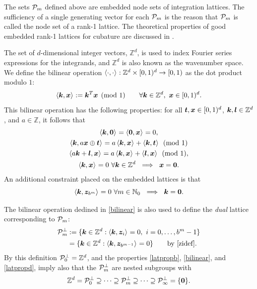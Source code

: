 \documentclass[graybox]{svmult}
\newcommand{\Z}{\mathbb{Z}} %
\newcommand{\N}{\mathbb{N}} %
\newcommand{\bszero}{\boldsymbol{0}} %
\newcommand{\bst}{\boldsymbol{t}}    %
\newcommand{\bsx}{\boldsymbol{x}}    %
\newcommand{\bsz}{\boldsymbol{z}}    %
\begin{document}
The sets $\mathcal{P}_m$ defined above are embedded node sets of integration lattices. The sufficiency of a single generating vector for each $\mathcal{P}_m$ is the reason that $\mathcal{P}_m$ is called the node set of a rank-1 lattice. 
The theoretical properties of good embedded rank-1 lattices for cubature are discussed in \cite{HicNie03a}.  
 
The set of $d$-dimensional integer vectors, $\Z^d$, is used to index Fourier series expressions for the integrands, and $\Z^d$ is also known as the wavenumber space. We define the bilinear operation $\ip{\cdot}{\cdot}: \Z^d \times \cube \to [0,1)$ as the dot product modulo $1$: 
\begin{equation}\label{bilinear}
\ip{\bsk}{\bsx}:=\bsk^T\bsx\pmod 1 \qquad \forall \bsk \in \Z^d, \ \bsx \in \cube.
\end{equation}
This bilinear operation has the following properties: for all $\bst, \bsx \in \cube$, $\bsk, \bsl \in \Z^d$, and $a \in \Z$, it follows that
\begin{subequations}
\begin{gather}
\ip{\bsk}{\bszero} = \ip{\bszero}{\bsx} = 0,\\
\ip{\bsk}{a \bsx \oplus \bst} = a\ip{\bsk}{\bsx} + \ip{\bsk}{\bst} \pmod 1 \label{bilinearlinxprop} \\
\ip{a \bsk + \bsl}{\bsx} = a\ip{\bsk}{\bsx} + \ip{\bsl}{\bsx} \pmod 1, \label{bilinearlinkprop}\\
\ip{\bsk}{\bsx} = 0 \ \forall \bsk \in \Z^d \ \implies \ \bsx=\bszero.\label{bilinearlinzeroprop}
\end{gather}
\end{subequations}
An additional constraint placed on the embedded lattices is that
\begin{equation}
\ip{\bsk}{\bsz_{b^m}} =  0 \ \forall m \in \N_0   \ \implies \ \bsk=\bszero. \label{latpropd}
\end{equation}

The bilinear operation dedined in \eqref{bilinear} is also used to define the \emph{dual} lattice corresponding to $\mathcal{P}_m$:
\begin{align}
\nonumber
\cp^{\perp}_m & := \{\bsk \in \Z^d : \ip{\bsk}{\bsz_i} = 0, \ i=0, \ldots, b^m-1\} \\
&= \{\bsk \in \Z^d : \ip{\bsk}{\bsz_{b^{m-1}}} = 0 \} \qquad \text{by \eqref{zidef}} .\label{dualdef}
\end{align}
By this definition $\cp^{\perp}_{0}=\Z^d$, and the properties \eqref{latpropb}, \eqref{bilinear}, and \eqref{latpropd}, imply also that the $\mathcal{P}^{\perp}_m$ are nested subgroups with
\begin{equation}\label{dualemb}
\Z^d=\cp^{\perp}_{0}\supseteq\dots\supseteq\cp^{\perp}_{m}\supseteq\dots\supseteq\cp^{\perp}_{\infty}=\{\bszero\}.
\end{equation}
\end{document}
